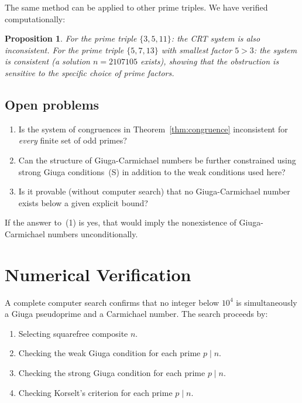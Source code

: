 \documentclass[12pt,a4paper]{amsart}
\newtheorem{proposition}[theorem]{Proposition}
\theoremstyle{definition}
\begin{document}
The same method can be applied to other prime triples.  We have verified
computationally:

\begin{proposition}
For the prime triple $\{3, 5, 11\}$: the CRT system is also inconsistent.
For the prime triple $\{5, 7, 13\}$ with smallest factor $5 > 3$: the system
is consistent (a solution $n = 2107105$ exists), showing that the obstruction
is sensitive to the specific choice of prime factors.
\end{proposition}

\subsection{Open problems}

\begin{enumerate}
  \item Is the system of congruences in Theorem~\ref{thm:congruence}
        inconsistent for \emph{every} finite set of odd primes?
  \item Can the structure of Giuga-Carmichael numbers be further constrained
        using strong Giuga conditions~(S) in addition to the weak conditions used
        here?
  \item Is it provable (without computer search) that no Giuga-Carmichael
        number exists below a given explicit bound?
\end{enumerate}

If the answer to~(1) is yes, that would imply the nonexistence of
Giuga-Carmichael numbers unconditionally.

\section{Numerical Verification}

A complete computer search confirms that no integer below $10^4$ is
simultaneously a Giuga pseudoprime and a Carmichael number.  The search
proceeds by:
\begin{enumerate}
  \item Selecting squarefree composite $n$.
  \item Checking the weak Giuga condition for each prime $p \mid n$.
  \item Checking the strong Giuga condition for each prime $p \mid n$.
  \item Checking Korselt's criterion for each prime $p \mid n$.
\end{enumerate}
\end{document}
